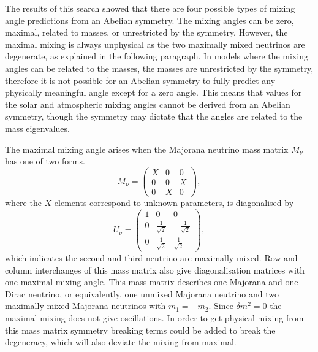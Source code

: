 \documentclass[nofootinbib,showpacs]{revtex4}
\begin{document}
The results of this search showed that there are four possible types of mixing angle predictions from an Abelian symmetry. The mixing angles can be zero, maximal, related to masses, or unrestricted by the symmetry. However, the maximal mixing is always unphysical as the two maximally mixed neutrinos are degenerate, as explained in the following paragraph. In models where the mixing angles can be related to the masses, the masses are unrestricted by the symmetry, therefore it is not possible for an Abelian symmetry to fully predict any physically meaningful angle except for a zero angle. This means that values for the solar and atmospheric mixing angles cannot be derived from an Abelian symmetry, though the symmetry may dictate that the angles are related to the mass eigenvalues. 

The maximal mixing angle arises when the Majorana neutrino mass matrix $M_\nu$ has one of two forms. 
\begin{equation}
M_\nu=\left(\begin{array}{ccc}X&0&0\\0&0&X\\0&X&0\end{array}\right),
\end{equation}
where the $X$ elements correspond to unknown parameters, is diagonalised by
\begin{equation}\label{maxatm}
U_\nu=\left(\begin{array}{ccc}1&0&0\\0&\frac{1}{\sqrt{2}}&-\frac{1}{\sqrt{2}}\\0&\frac{1}{\sqrt{2}}&\frac{1}{\sqrt{2}}\end{array}\right), 
\end{equation}
which indicates the second and third neutrino are maximally mixed. Row and column interchanges of this mass matrix also give diagonalisation matrices with one maximal mixing angle. 
This mass matrix describes one Majorana and one Dirac neutrino, or equivalently, one unmixed Majorana neutrino and two maximally mixed Majorana neutrinos with $m_1=-m_2$. Since $\delta m^2=0$ the maximal mixing does not give oscillations. In order to get physical mixing from this mass matrix symmetry breaking terms could be added to break the degeneracy, which will also deviate the mixing from maximal. 
\end{document}
